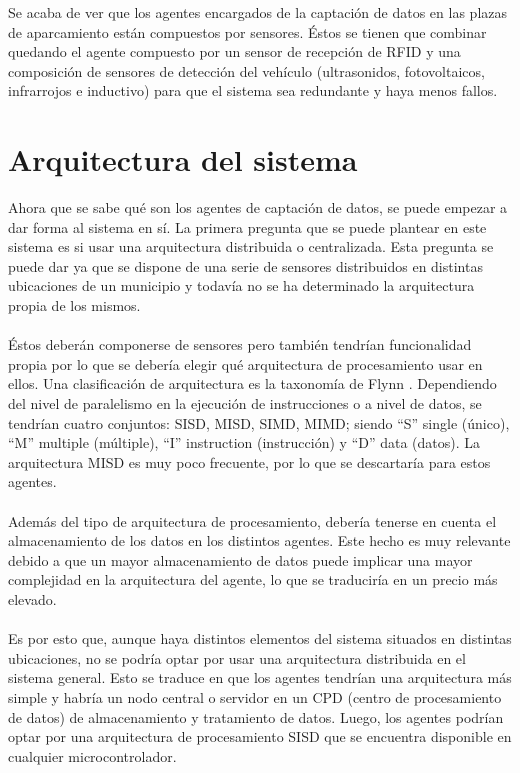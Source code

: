 Se acaba de ver que los agentes encargados de la captación de datos en las plazas de aparcamiento están compuestos por sensores. Éstos se tienen que combinar quedando el agente compuesto por un sensor de recepción de RFID y una composición de sensores de detección del vehículo (ultrasonidos, fotovoltaicos, infrarrojos e inductivo) para que el sistema sea redundante y haya menos fallos.
\section{Arquitectura del sistema} \label{arquitectura}
Ahora que se sabe qué son los agentes de captación de datos, se puede empezar a dar forma al sistema en sí. La primera pregunta que se puede plantear en este sistema es si usar una arquitectura distribuida o centralizada. Esta pregunta se puede dar ya que se dispone de una serie de sensores distribuidos en distintas ubicaciones de un municipio y todavía no se ha determinado la arquitectura propia de los mismos.
\\\\
Éstos deberán componerse de sensores pero también tendrían funcionalidad propia por lo que se debería elegir qué arquitectura de procesamiento usar en ellos. Una clasificación de arquitectura es la taxonomía de Flynn \cite{flynn}. Dependiendo del nivel de paralelismo en la ejecución de instrucciones o a nivel de datos, se tendrían cuatro conjuntos: SISD, MISD, SIMD, MIMD; siendo “S” single (único), “M” multiple (múltiple), “I” instruction (instrucción) y “D” data (datos). La arquitectura MISD es muy poco frecuente, por lo que se descartaría para estos agentes.
\\\\
Además del tipo de arquitectura de procesamiento, debería tenerse en cuenta el almacenamiento de los datos en los distintos agentes. Este hecho es muy relevante debido a que un mayor almacenamiento de datos puede implicar una mayor complejidad en la arquitectura del agente, lo que se traduciría en un precio más elevado.
\\\\
Es por esto que, aunque haya distintos elementos del sistema situados en distintas ubicaciones, no se podría optar por usar una arquitectura distribuida en el sistema general. Esto se traduce en que los agentes tendrían una arquitectura más simple y habría un nodo central o servidor en un CPD (centro de procesamiento de datos) de almacenamiento y tratamiento de datos. Luego, los agentes podrían optar por una arquitectura de procesamiento SISD que se encuentra disponible en cualquier microcontrolador.
